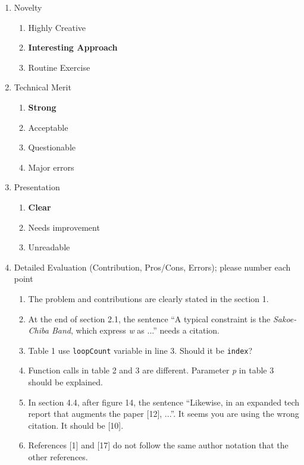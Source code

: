 \documentclass{article}
\begin{document}
\begin{enumerate}
 \item Novelty
 \begin{enumerate}[I]
  \item Highly Creative
  \item \textbf{Interesting Approach}
  \item Routine Exercise
 \end{enumerate} 
 
 \item Technical Merit
 \begin{enumerate}[I]
  \item \textbf{Strong}
  \item Acceptable
  \item Questionable
  \item Major errors
 \end{enumerate} 
 
 \item Presentation
 \begin{enumerate}[I]
  \item \textbf{Clear}
  \item Needs improvement
  \item Unreadable
 \end{enumerate}
 
 \item Detailed Evaluation (Contribution, Pros/Cons, Errors); please number each point
 \begin{framed}
  \begin{enumerate}
    \item The problem and contributions are clearly stated in the section 1.  
    \item At the end of section 2.1, the sentence ``A typical constraint is the \textit{Sakoe-Chiba Band}, which express \textit{w} as ...'' needs a citation.
    \item Table 1 use \texttt{loopCount} variable in line 3. Should it be \texttt{index}?
    \item Function calls in table 2 and 3 are different.  Parameter \textit{p} in table 3 should be explained.
    \item In section 4.4, after figure 14, the sentence ``Likewise, in an expanded tech report that augments the paper [12], ...''.  It seems you are using the wrong citation. It should be [10].
    \item References [1] and [17] do not follow the same author notation that the other references.
  \end{enumerate}
 \end{framed}
 

\end{enumerate}
\end{document}
